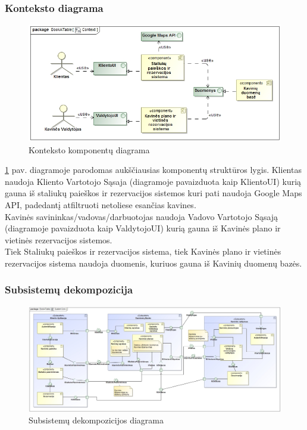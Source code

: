 \documentclass{VUMIFPSkursinis}
\begin{document}
\subsubsection{Konteksto diagrama}

\begin {figure}[H]
	\includegraphics[width=\textwidth,height=\textheight,keepaspectratio]{img/Context}
	\caption{Konteksto komponentų diagrama}
	\label{fig:Context}
\end{figure}

\ref {fig:Context} pav. diagramoje parodomas aukščiausias komponentų struktūros lygis. Klientas naudoja Kliento Vartotojo Sąsaja (diagramoje pavaizduota kaip KlientoUI) kurią gauna iš staliukų paieškos ir rezervacijos sistemos kuri pati naudoja Google Maps API, padedantį atfiltruoti netoliese esančias kavines. \\
Kavinės savininkas/vadovas/darbuotojas naudoja Vadovo Vartotojo Sąsają (diagramoje pavaizduota kaip ValdytojoUI) kurią gauna iš Kavinės plano ir vietinės rezervacijos sistemos.\\
Tiek Staliukų paieškos ir rezervacijos sistema, tiek Kavinės plano ir vietinės rezervacijos sistema naudoja duomenis, kuriuos gauna iš Kavinių duomenų bazės.


\begin{landscape}
\subsubsection{Subsistemų dekompozicija}
	\begin {figure}[H]
		\includegraphics[width=1.65\textwidth,height=1.65\textheight,keepaspectratio]{img/SystemCore}
		\caption{Subsistemų dekompozicijos diagrama}
		\label{fig:System Core}
	\end{figure}
\end{landscape}
\end{document}
